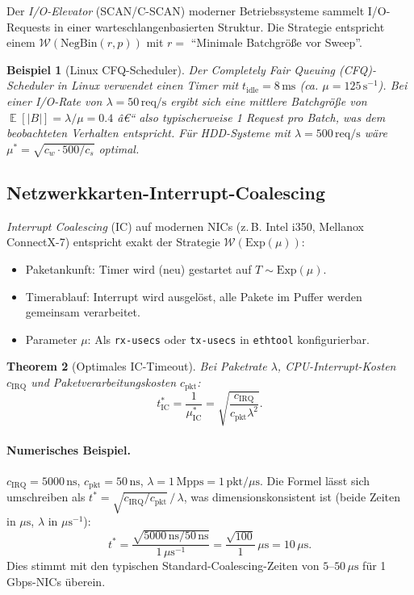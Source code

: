 ﻿\documentclass[12pt, a4paper]{article}
\newtheorem{theorem}{Theorem}[section]
\newtheorem{example}[theorem]{Beispiel}
\DeclareMathOperator{\E}{\mathbb{E}}
\newcommand{\Exp}{\mathrm{Exp}}
\newcommand{\NBin}{\mathrm{NegBin}}
\begin{document}
Der \emph{I/O-Elevator} (SCAN/C-SCAN) moderner Betriebssysteme sammelt I/O-Requests
in einer warteschlangenbasierten Struktur. Die Strategie entspricht einem
$\mathcal{W}(\NBin(r, p))$ mit $r = $ ``Minimale Batchgröße vor Sweep''.

\begin{example}[Linux CFQ-Scheduler]\label{ex:cfq}
Der \emph{Completely Fair Queuing (CFQ)}-Scheduler in Linux verwendet einen
Timer mit $t_{\mathrm{idle}} = 8\,\mathrm{ms}$ (ca. $\mu = 125\,\mathrm{s}^{-1}$).
Bei einer I/O-Rate von $\lambda = 50\,\mathrm{req/s}$ ergibt sich eine
mittlere Batchgröße von $\E[|B|] = \lambda/\mu = 0.4$ â€“ also typischerweise
1 Request pro Batch, was dem beobachteten Verhalten entspricht. Für
HDD-Systeme mit $\lambda = 500\,\mathrm{req/s}$ wäre
$\mu^* = \sqrt{c_w \cdot 500/c_s}$ optimal.
\end{example}

\subsection{Netzwerkkarten-Interrupt-Coalescing}

\emph{Interrupt Coalescing} (IC) auf modernen NICs (z.\,B. Intel i350, Mellanox
ConnectX-7) entspricht exakt der Strategie $\mathcal{W}(\Exp(\mu))$:
\begin{itemize}[noitemsep]
  \item Paketankunft: Timer wird (neu) gestartet auf $T \sim \Exp(\mu)$.
  \item Timerablauf: Interrupt wird ausgelöst, alle Pakete im Puffer werden
        gemeinsam verarbeitet.
  \item Parameter $\mu$: Als \texttt{rx-usecs} oder \texttt{tx-usecs} in
        \texttt{ethtool} konfigurierbar.
\end{itemize}

\begin{theorem}[Optimales IC-Timeout]\label{thm:nictimeout}
Bei Paketrate $\lambda$, CPU-Interrupt-Kosten $c_{\mathrm{IRQ}}$ und
Paketverarbeitungskosten $c_{\mathrm{pkt}}$:
\[
  t^*_{\mathrm{IC}} = \frac{1}{\mu^*_{\mathrm{IC}}} =
  \sqrt{\frac{c_{\mathrm{IRQ}}}{c_{\mathrm{pkt}} \lambda^2}}.
\]
\end{theorem}

\paragraph{Numerisches Beispiel.}
$c_{\mathrm{IRQ}} = 5000\,\mathrm{ns}$, $c_{\mathrm{pkt}} = 50\,\mathrm{ns}$,
$\lambda = 1\,\mathrm{Mpps} = 1\,\mathrm{pkt}/\mu\mathrm{s}$.
Die Formel lässt sich umschreiben als
$t^* = \sqrt{c_{\mathrm{IRQ}}/c_{\mathrm{pkt}}}\,/\,\lambda$, was
dimensionskonsistent ist (beide Zeiten in $\mu\mathrm{s}$,
$\lambda$ in $\mu\mathrm{s}^{-1}$):
\[
  t^* = \frac{\sqrt{5000\,\mathrm{ns}/50\,\mathrm{ns}}}{1\,\mu\mathrm{s}^{-1}}
      = \frac{\sqrt{100}}{1}\,\mu\mathrm{s}
      = 10\,\mu\mathrm{s}.
\]
Dies stimmt mit den typischen Standard-Coalescing-Zeiten von
$5$--$50\,\mu\mathrm{s}$ für 1\,Gbps-NICs überein.
\end{document}
